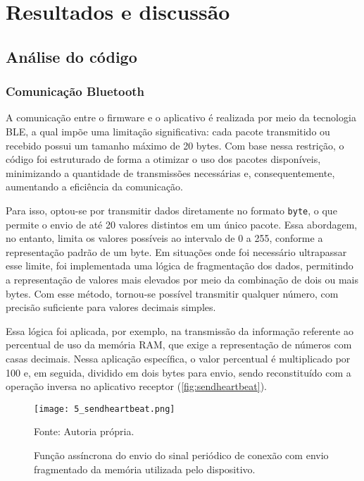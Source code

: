 \chapter[Resultados e discussão]{Resultados e discussão}



\section{Análise do código}
\subsection{Comunicação Bluetooth}

A comunicação entre o firmware e o aplicativo é realizada por meio da tecnologia BLE, a qual impõe uma limitação significativa: cada pacote transmitido ou recebido possui um tamanho máximo de 20 bytes. Com base nessa restrição, o código foi estruturado de forma a otimizar o uso dos pacotes disponíveis, minimizando a quantidade de transmissões necessárias e, consequentemente, aumentando a eficiência da comunicação.

Para isso, optou-se por transmitir dados diretamente no formato \texttt{byte}, o que permite o envio de até 20 valores distintos em um único pacote. Essa abordagem, no entanto, limita os valores possíveis ao intervalo de 0 a 255, conforme a representação padrão de um byte. Em situações onde foi necessário ultrapassar esse limite, foi implementada uma lógica de fragmentação dos dados, permitindo a representação de valores mais elevados por meio da combinação de dois ou mais bytes. Com esse método, tornou-se possível transmitir qualquer número, com precisão suficiente para valores decimais simples.

Essa lógica foi aplicada, por exemplo, na transmissão da informação referente ao percentual de uso da memória RAM, que exige a representação de números com casas decimais. Nessa aplicação específica, o valor percentual é multiplicado por 100 e, em seguida, dividido em dois bytes para envio, sendo reconstituído com a operação inversa no aplicativo receptor (\autoref{fig:sendheartbeat}).

\begin{figure}[ht]
    \centering
    \caption{Função assíncrona do envio do sinal periódico de conexão com envio fragmentado da memória utilizada pelo dispositivo.}
    \label{fig:sendheartbeat}
    \texttt{[image: 5\_sendheartbeat.png]}

    {\centering\footnotesize Fonte: Autoria própria.\par}
\end{figure}


